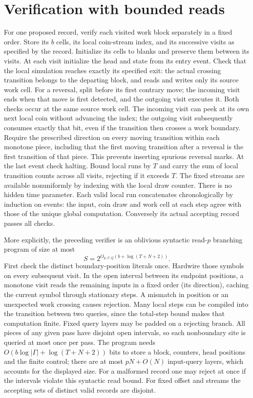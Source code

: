 \documentclass[11pt]{article}
\begin{document}
\section{Verification with bounded reads}
For one proposed record, verify each visited work block separately in a fixed order. Store its $b$ cells, its local coin-stream index, and its successive visits as specified by the record. Initialize its cells to blanks and preserve them between its visits. At each visit initialize the head and state from its entry event. Check that the local simulation reaches exactly its specified exit: the actual crossing transition belongs to the departing block, and reads and writes only its source work cell. For a reversal, split before its first contrary move; the incoming visit ends when that move is first detected, and the outgoing visit executes it. Both checks occur at the same source work cell. The incoming visit can peek at its own next local coin without advancing the index; the outgoing visit subsequently consumes exactly that bit, even if the transition then crosses a work boundary. Require the prescribed direction on every moving transition within each monotone piece, including that the first moving transition after a reversal is the first transition of that piece. This prevents inserting spurious reversal marks. At the last event check halting. Bound local runs by $T$ and carry the sum of local transition counts across all visits, rejecting if it exceeds $T$. The fixed streams are available nonuniformly by indexing with the local draw counter. There is no hidden time parameter. Each valid local run concatenates chronologically by induction on events: the input, coin draw and work cell at each step agree with those of the unique global computation. Conversely its actual accepting record passes all checks.

More explicitly, the preceding verifier is an oblivious syntactic read-$p$ branching program of size at most
\[
 S=2^{O_{p,\Gamma,Q}(b+\log(T+N+2))}.
\]
First check the distinct boundary-position literals once. Hardwire those symbols on every subsequent visit. In the open interval between its endpoint positions, a monotone visit reads the remaining inputs in a fixed order (its direction), caching the current symbol through stationary steps. A mismatch in position or an unexpected work crossing causes rejection. Many local steps can be compiled into the transition between two queries, since the total-step bound makes that computation finite. Fixed query layers may be padded on a rejecting branch. All pieces of any given pass have disjoint open intervals, so each nonboundary site is queried at most once per pass. The program needs $O(b\log|\Gamma|+\log(T+N+2))$ bits to store a block, counters, head positions and the finite control; there are at most $pN+O(N)$ input-query layers, which accounts for the displayed size. For a malformed record one may reject at once if the intervals violate this syntactic read bound. For fixed offset and streams the accepting sets of distinct valid records are disjoint.
\end{document}
